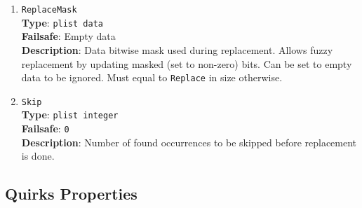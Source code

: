 \documentclass[]{article}
\begin{document}
\begin{enumerate}
\item
  \texttt{ReplaceMask}\\
  \textbf{Type}: \texttt{plist\ data}\\
  \textbf{Failsafe}: Empty data\\
  \textbf{Description}: Data bitwise mask used during replacement.
  Allows fuzzy replacement by updating masked (set to non-zero) bits. Can be
  set to empty data to be ignored. Must equal to \texttt{Replace} in size
  otherwise.

\item
  \texttt{Skip}\\
  \textbf{Type}: \texttt{plist\ integer}\\
  \textbf{Failsafe}: \texttt{0}\\
  \textbf{Description}: Number of found occurrences to be skipped before replacement
  is done.

\end{enumerate}

\subsection{Quirks Properties}\label{kernelpropsquirks}
\end{document}
